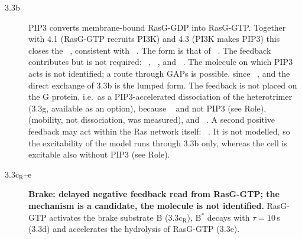 \begin{description}
\item[3.3b] PIP3 converts membrane-bound RasG-GDP into RasG-GTP. Together with 4.1 (RasG-GTP recruits PI3K) and 4.3 (PI3K makes PIP3) this closes the ~\cite{fukushima2019}, consistent with ~\cite{kataria2013}. The form is that of ~\cite{fukushima2019}. The feedback contributes but is not required: ~\cite{sasaki2004}, ~\cite{fukushima2019}, and ~\cite{li2018}.
The molecule on which PIP3 acts is not identified; a route through GAPs is possible, since ~\cite{li2018}, and the direct exchange of 3.3b is the lumped form.
The feedback is not placed on the G protein, i.e.\ as a PIP3-accelerated dissociation of the heterotrimer (3.3g, available as an option), because ~\cite{xu2005} and not PIP3 (see Role), ~\cite{vanhemert2010} (mobility, not dissociation, was measured), and ~\cite{kortholt2013}.
A second positive feedback may act within the Ras network itself: ~\cite{iwamoto2025}. It is not modelled, so the excitability of the model runs through 3.3b only, whereas the cell is excitable also without PIP3 (see Role).
\item[3.3c$_\mathrm{R}$--e] \textbf{Brake: delayed negative feedback read from RasG-GTP; the mechanism is a candidate, the molecule is not identified.}
RasG-GTP activates the brake substrate B (3.3c$_\mathrm{R}$), B$^*$ decays with $\tau=10$\,s (3.3d) and accelerates the hydrolysis of RasG-GTP (3.3e).

\end{description}
